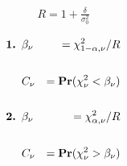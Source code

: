 \documentclass[12pt]{article}
\begin{document}
\pagestyle{empty} 
\Large
{}
\pagecolor{ehandbook}

\boldmath 


\begin{eqnarray*}
R = 1 + \frac{\delta}{\sigma^2_0}
\end{eqnarray*}

\hspace*{.25in}
 
\begin{eqnarray*}
\mbox{\bf 1.  } & \beta_\nu & = \chi^2_{1-\alpha, \nu} / R \\
 & & \\
                      & C_\nu  & = \mbox{\bf Pr}(\chi^2_\nu < \beta_\nu) \\
 & & \\
\mbox{\bf 2.  } & \beta_\nu & = \chi^2_{\alpha, \nu} / R \\
 & & \\
                      & C_\nu  & = \mbox{\bf Pr}(\chi^2_\nu > \beta_\nu) 
\end{eqnarray*}
\end{document}
